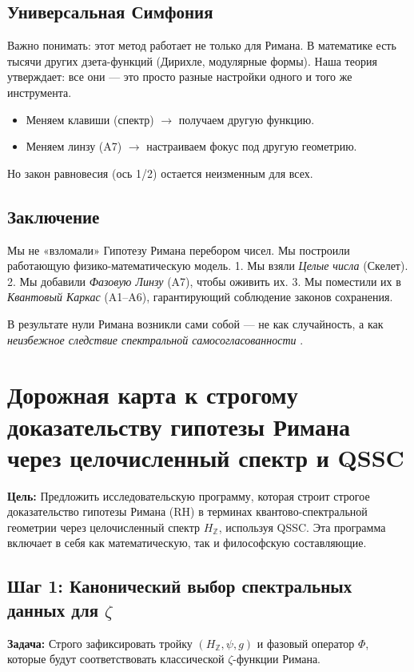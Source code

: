 \documentclass{article}
\numberwithin{equation}{section}
\theoremstyle{plain}
\theoremstyle{definition}
\theoremstyle{remark}
\begin{document}
\subsection*{Универсальная Симфония}
Важно понимать: этот метод работает не только для Римана.
В математике есть тысячи других дзета-функций (Дирихле, модулярные формы). Наша теория утверждает: все они — это просто разные настройки одного и того же инструмента.
\begin{itemize}
    \item Меняем клавиши (спектр) $\to$ получаем другую функцию.
    \item Меняем линзу (A7) $\to$ настраиваем фокус под другую геометрию.
\end{itemize}
Но закон равновесия (ось 1/2) остается неизменным для всех.

\subsection*{Заключение}
Мы не «взломали» Гипотезу Римана перебором чисел. Мы построили работающую физико-математическую модель.
1. Мы взяли \emph{Целые числа} (Скелет).
2. Мы добавили \emph{Фазовую Линзу} (A7), чтобы оживить их.
3. Мы поместили их в \emph{Квантовый Каркас} (A1–A6), гарантирующий соблюдение законов сохранения.

В результате нули Римана возникли сами собой — не как случайность, а как \emph{неизбежное следствие спектральной самосогласованности} .


\section {Дорожная карта к строгому доказательству гипотезы Римана через целочисленный спектр и QSSC}

\textbf{Цель:}
Предложить исследовательскую программу, которая строит строгое доказательство гипотезы Римана (RH) в терминах квантово-спектральной геометрии через целочисленный спектр $H_{\mathbb{Z}}$, используя QSSC. Эта программа включает в себя как математическую, так и философскую составляющие.

\subsection*{Шаг 1: Канонический выбор спектральных данных для $\zeta$}
\textbf{Задача:} Строго зафиксировать тройку $(H_{\mathbb{Z}}, \psi, g)$ и фазовый оператор $\Phi$, которые будут соответствовать классической $\zeta$-функции Римана.
\end{document}

